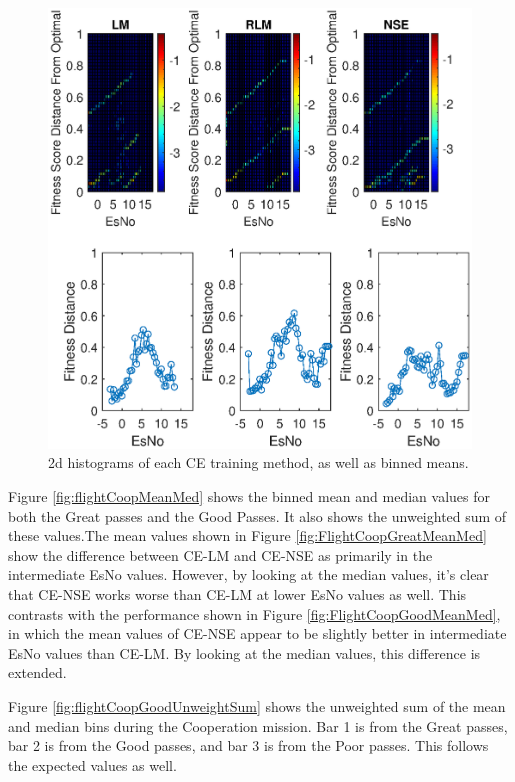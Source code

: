 \begin{figure}[ht]
\centering
\includegraphics[width=\textwidth]{figures/flight_results/coop_good_2dhist.eps}
\caption{2d histograms of each CE training method, as well as binned means.}
\label{fig:coop_good_2dhist}
\end{figure}

\par Figure \ref{fig:flightCoopMeanMed} shows the binned mean and median values for both the Great passes and the Good Passes. It also shows the unweighted sum of these values.The mean values shown in Figure \ref{fig:FlightCoopGreatMeanMed} show the difference between CE-LM and CE-NSE as primarily in the intermediate EsNo values. However, by looking at the median values, it's clear that CE-NSE works worse than CE-LM at lower EsNo values as well. This contrasts with the performance shown in Figure \ref{fig:FlightCoopGoodMeanMed}, in which the mean values of CE-NSE appear to  be slightly better in intermediate EsNo values than CE-LM. By looking at the median values, this difference is extended. 
\par Figure \ref{fig:flightCoopGoodUnweightSum} shows the unweighted sum of the mean and median bins during the Cooperation mission. Bar 1 is from the Great passes, bar 2 is from the Good passes, and bar 3 is from the Poor passes. This follows the expected values as well.

